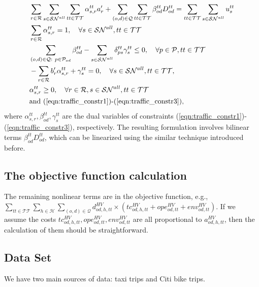 \documentclass[trsc,nonblindrev]{informs3noheader}
\begin{document}
\begin{align}
    & \sum_{r\in \mathcal{R}} \sum_{s \in \mathcal{SN}^{all}} \sum_{tt \in \mathcal{TT}} \alpha_{s,r}^{tt} a_r' + \sum_{(o,d) \in \mathcal{Q}}  \sum_{tt \in \mathcal{TT}} \beta_{od}^{tt} D_{od}^{tt} = \sum_{tt\in \mathcal{TT}} \sum_{s \in \mathcal{SN}^{all}} u_s^{tt} \\
    & \sum_{r\in \mathcal{R}} \alpha_{s,r}^{tt} = 1, \quad \forall  s \in \mathcal{SN}^{all}, tt \in \mathcal{TT} \\
    &  \sum_{(o,d) \in \mathcal{Q}:\ p \in \mathcal{P}_{od}} \beta_{od}^{tt} - \sum_{s \in \mathcal{SN}^{all}} \delta_{ps}^{tt} \gamma_s^{tt} \leq 0,\quad \forall p \in \mathcal{P}, tt \in \mathcal{TT} \\
    & -\sum_{r \in \mathcal{R}} b_r' \alpha_{s,r}^{tt} + \gamma_s^{tt} = 0, \quad \forall  s \in \mathcal{SN}^{all}, tt \in \mathcal{TT}, \\
    & \alpha_{s,r}^{tt} \geq 0, \quad \forall r\in \mathcal{R}, s \in \mathcal{SN}^{all}, tt \in \mathcal{TT} \\
    & \text{and (\ref{eqn:traffic_constr1})-(\ref{eqn:traffic_constr3})}, \nonumber
\end{align}
where $\alpha_{s,r}^{tt}, \beta_{od}^{tt}, \gamma_s^{tt}$ are the dual variables of constraints (\ref{eqn:traffic_constr1})-(\ref{eqn:traffic_constr3}), respectively. The resulting formulation involves bilinear terms $\beta_{od}^{tt} D_{od}^{tt}$, which can be linearized using the similar technique introduced before.

\subsection{The objective function calculation} 
The remaining nonlinear terms are in the objective function, e.g.,  $\sum_{tt \in \mathcal{TT}}\sum_{h\in \mathcal{H}}\sum_{(o,d)\in \mathcal{Q}} d_{od,h,tt}^{HV} \times (tc^{HV}_{od,h,tt}+ope^{HV}_{od,tt}+env^{HV}_{od,tt})$. If we assume the costs $tc^{HV}_{od,h,tt}, ope^{HV}_{od,tt}, env^{HV}_{od,tt}$ are all proportional to $a_{od,h,tt}^{HV}$, then the calculation of them should be straightforward.


\subsection{Data Set}
We have two main sources of data: taxi trips and Citi bike trips. 


\end{document}
